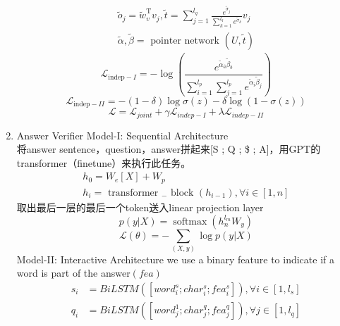 \documentclass[a4paper,UTF8]{article}
\numberwithin{equation}{section}
\begin{document}
\begin{enumerate}
	\begin{equation}
	\begin{array}{c}{\tilde{o}_{j}=\tilde{w}_{v}^{\mathrm{T}} v_{j}, \tilde{t}=\sum_{j=1}^{l_{q}} \frac{e^{\tilde{\sigma}_{j}}}{\sum_{k=1}^{l_{q}} e^{\tilde{\sigma}_{k}}} v_{j}} \\ {\tilde{\alpha}, \tilde{\beta}=\text { pointer network }(U, \tilde{t})}\end{array}
	\end{equation}
	\begin{equation}
		\mathcal{L}_{\text {indep}-I}=-\log \left(\frac{e^{\tilde{\alpha}_{\overline{a}} \tilde{\beta}_{\overline{b}}}}{\sum_{i=1}^{l_{p}} \sum_{j=1}^{l_{p}} e^{\tilde{\alpha}_{i} \tilde{\beta}_{j}}}\right)
		\end{equation}
		\begin{equation}
			\mathcal{L}_{\text {indep}-I I}=-(1-\delta) \log \sigma(z)-\delta \log (1-\sigma(z))
			\end{equation}
			\begin{equation}
				\mathcal{L}=\mathcal{L}_{j o i n t}+\gamma \mathcal{L}_{i n d e p-I}+\lambda \mathcal{L}_{i n d e p-I I}
				\end{equation}
	\item Answer Verifier
	\subitem[1] Model-I: Sequential Architecture\\
	将answer sentence，question，answer拼起来[S ; Q ; \$ ; A]，用GPT的transformer（finetune）来执行此任务。
	\begin{equation}
	\begin{array}{c}{h_{0}=W_{e}[X]+W_{p}} \\ {h_{i}=\text { transformer }_{-} \text { block }\left(h_{i-1}\right), \forall i \in[1, n]}\end{array}
	\end{equation}
	取出最后一层的最后一个token送入linear projection layer
	\begin{equation}
		p(y | X)=\operatorname{softmax}\left(h_{n}^{l_{m}} W_{y}\right)
		\end{equation}
		\begin{equation}
			\mathcal{L}(\theta)=-\sum_{(X, y)} \log p(y | X)
			\end{equation}
	\subitem[2] Model-II: Interactive Architecture
	we use a binary feature to indicate if a word is part of the answer$(fea)$
	\begin{align*}
		s_i &= BiLSTM([word_i^s;char_i^s;fea_i^s]),\forall i \in [1,l_s]\\
		q_i &= BiLSTM([word_j^1;char_j^q;fea_j^q]),\forall j \in [1,l_q]

\end{align*}
\end{enumerate}
\end{document}
